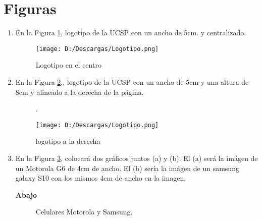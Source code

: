 \documentclass{article}
\begin{document}
\section{Figuras}
	\begin{enumerate}
		\item En la Figura \ref{figure:centro}, logotipo de la UCSP con un ancho de 5cm. y centralizado.
			\begin{figure}[h!]
				\begin{center}
				\caption{Logotipo en el centro}\label{figure:centro}
					\texttt{[image: D:/Descargas/Logotipo.png]}

				\end{center}
			\end{figure}
	\item En la Figura \ref{figure:derecha},, logotipo de la UCSP con un ancho de 5cm y una altura de 8cm y alineado a la derecha de la
página.	

		\begin{figure}[h!]
			\parbox{13cm}{.}\parbox{5cm}{ \caption{logotipo a la derecha}\label{figure:derecha}
				\texttt{[image: D:/Descargas/Logotipo.png]}}


		\end{figure}
	\item En la Figura  \ref{table:doscelulares}, colocará dos gráficos juntos (a) y (b). El (a) será la imágen de un Motorola G6 de 4cm de ancho.
El (b) sería la imágen de un samsung galaxy S10 con los mismos 4cm de ancho en la imagen.

\textbf{Abajo}

		\begin{figure}[h!]
		\centering


		\caption{Celulares Motorola y Samsung.}\label{table:doscelulares}

		\end{figure}
	

	\end{enumerate}
\end{document}
